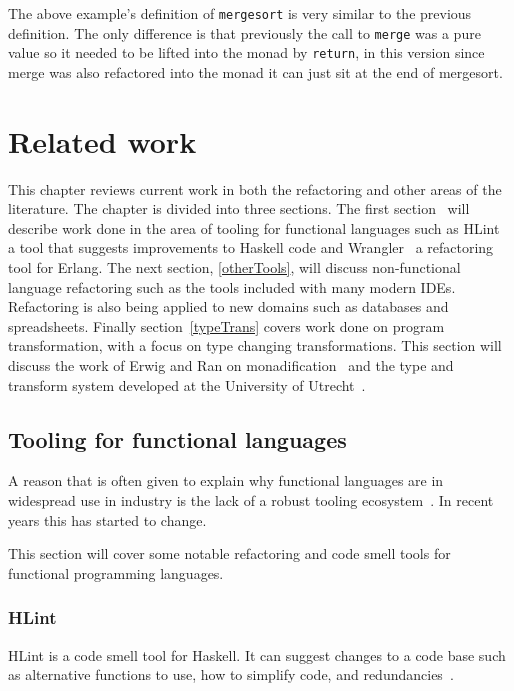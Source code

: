 The above example's definition of \texttt{mergesort} is very similar to the previous definition. The only difference is that previously the call to \texttt{merge} was a pure value so it needed to be lifted into the monad by \texttt{return}, in this version since merge was also refactored into the monad it can just sit at the end of mergesort.

\fi 


\chapter{Related work}

This chapter reviews current work in both the refactoring and other areas of the literature. The chapter is divided into three sections. The first section~\label{funcTools} will describe work done in the area of tooling for functional languages such as HLint~\citep{hlint} a tool that suggests improvements to Haskell code and Wrangler~\citep{wrangler} a refactoring tool for Erlang. The next section, \ref{otherTools}, will discuss non-functional language refactoring such as the tools included with many modern IDEs. Refactoring is also being applied to new domains such as databases and spreadsheets. Finally section~\ref{typeTrans} covers work done on program transformation, with a focus on type changing transformations. This section will discuss the work of Erwig and Ran on monadification~\citep{monadification} and the type and transform system developed at the University of Utrecht~\citep{typeAndTransform}.

\section{Tooling for functional languages}\label{funcTools}
A reason that is often given to explain why functional languages are in widespread use in industry is the lack of a robust tooling ecosystem~\citep{wadlerTools}. In recent years this has started to change. 


This section will cover some notable refactoring and code smell tools for functional programming languages.

\subsection{HLint}

HLint is a code smell tool for Haskell. It can suggest changes to a code base such as alternative functions to use, how to simplify code, and redundancies~\citep{hlint}.

